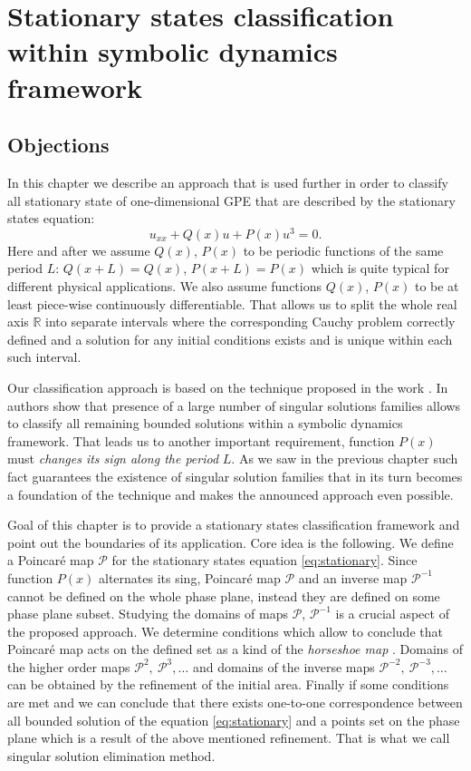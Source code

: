 \chapter{Stationary states classification within symbolic dynamics framework}

\section{Objections}

In this chapter we describe an approach that is used further in order to classify all stationary state of one-dimensional GPE that are described by the stationary states equation:
\begin{equation}
	u_{xx} + Q(x) u + P(x) u^3 = 0.
	\label{eq:stationary}
\end{equation}
Here and after we assume $Q(x)$, $P(x)$ to be periodic functions of the same period $L$: $Q(x + L) = Q(x)$, $P(x + L) = P(x)$ which is quite typical for different physical applications.
We also assume functions $Q(x)$, $P(x)$ to be at least piece-wise continuously differentiable.
That allows us to split the whole real axis $\mathbb{R}$ into separate intervals where the corresponding Cauchy problem correctly defined and a solution for any initial conditions exists and is unique within each such interval.

Our classification approach is based on the technique proposed in the work \cite{AlfimovAvramenko}.
In \cite{AlfimovAvramenko} authors show that presence of a large number of singular solutions families allows to classify all remaining bounded solutions within a symbolic dynamics framework.
That leads us to another important requirement, function $P(x)$ must {\it changes its sign along the period} $L$.
As we saw in the previous chapter such fact guarantees the existence of singular solution families that in its turn becomes a foundation of the technique and makes the announced approach even possible.

Goal of this chapter is to provide a stationary states classification framework and point out the boundaries of its application.
Core idea is the following.
We define a Poincar\'e map $\mathcal{P}$ for the stationary states equation \eqref{eq:stationary}.
Since function $P(x)$ alternates its sing, Poincar\'e map $\mathcal{P}$ and an inverse map $\mathcal{P}^{-1}$ cannot be defined on the whole phase plane, instead they are defined on some phase plane subset.
Studying the domains of maps $\mathcal{P}$, $\mathcal{P}^{-1}$ is a crucial aspect of the proposed approach.
We determine conditions which allow to conclude that Poincar\'e map acts on the defined set as a kind of the {\it horseshoe map} \cite[Chapter 5]{GuekenheimerHolmes}.
Domains of the higher order maps $\mathcal{P}^2,~\mathcal{P}^3, \dots$ and domains of the inverse maps $\mathcal{P}^{-2},~\mathcal{P}^{-3}, \dots$ can be obtained by the refinement of the initial area.
Finally if some conditions are met and we can conclude that there exists one-to-one correspondence between all bounded solution of the equation \eqref{eq:stationary} and a points set on the phase plane which is a result of the above mentioned refinement.
That is what we call singular solution elimination method.

